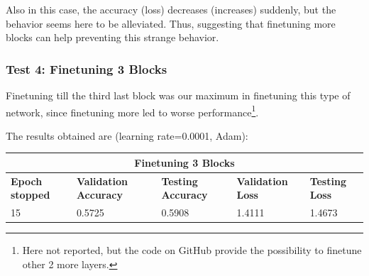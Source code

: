Also in this case, the accuracy (loss) decreases (increases) suddenly, but the behavior seems here to be alleviated. Thus, suggesting that finetuning more blocks can help preventing this strange behavior.


\subsubsection{Test 4: Finetuning 3 Blocks}
Finetuning till the third last block was our maximum in finetuning this type of network, since finetuning more led to worse performance\footnote{Here not reported, but the code on GitHub provide the possibility to finetune other 2 more layers.}.

\noindent The results obtained are (learning rate=0.0001, Adam):

\medskip

\begin{tabular}{ |p{2cm}|p{2cm}|p{2cm}|p{2cm}|p{2cm}|  }
\hline
\multicolumn{5}{|c|}{Finetuning 3 Blocks} \\
\hline
\textbf{Epoch stopped} & \textbf{Validation Accuracy} & \textbf{Testing Accuracy} & \textbf{Validation Loss} & \textbf{Testing Loss} \\
\hline
15 & 0.5725 & 0.5908 & 1.4111 & 1.4673\\
\hline
\end{tabular}

